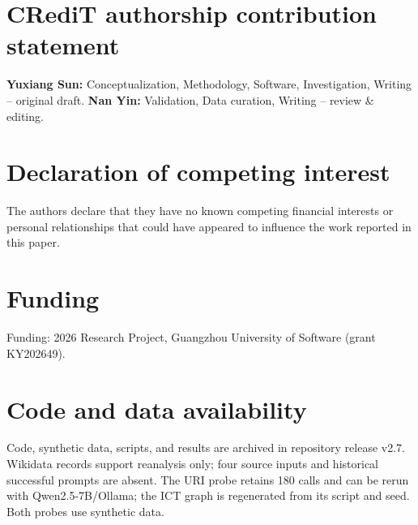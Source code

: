 \documentclass[a4paper,fleqn]{cas-dc}
\begin{document}
\footnotesize
\section*{CRediT authorship contribution statement}
\textbf{Yuxiang Sun:} Conceptualization, Methodology, Software, Investigation, Writing -- original draft. \textbf{Nan Yin:} Validation, Data curation, Writing -- review \& editing.

\section*{Declaration of competing interest}
The authors declare that they have no known competing financial interests or personal relationships that could have appeared to influence the work reported in this paper.

\section*{Funding}
Funding: 2026 Research Project, Guangzhou University of Software (grant KY202649).

\section*{Code and data availability}
Code, synthetic data, scripts, and results are archived in repository release v2.7. Wikidata records support reanalysis only; four source inputs and historical successful prompts are absent. The URI probe retains 180 calls and can be rerun with Qwen2.5-7B/Ollama; the ICT graph is regenerated from its script and seed. Both probes use synthetic data.
\end{document}
